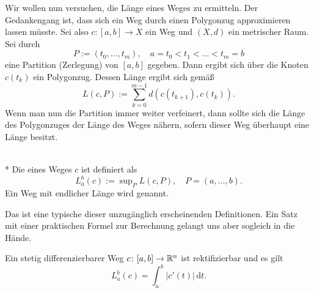 Wir wollen nun versuchen, die Länge eines Weges zu ermitteln.
Der Gedankengang ist, dass sich ein Weg durch einen Polygonzug
approximieren lassen müsste. Sei also $c\colon [a,b]\to X$
ein Weg und $(X,d)$ ein metrischer Raum. Sei durch%
\begin{equation}
P:=(t_0,\ldots,t_m),\quad a=t_0<t_1<\ldots <t_m=b
\end{equation}
eine Partition (Zerlegung) von $[a,b]$ gegeben. Dann ergibt sich
über die Knoten $c(t_k)$ ein Polygonzug. Dessen Länge ergibt
sich gemäß%
\begin{equation}
L(c,P) := \sum_{k=0}^{m-1} d(c(t_{k+1}),c(t_k)).
\end{equation}
Wenn man nun die Partition immer weiter verfeinert, dann sollte
sich die Länge des Polygonzuges der Länge des Weges nähern, sofern
dieser Weg überhaupt eine Länge besitzt.
\begin{definition}%
\mbox{}\\*
Die  eines Weges $c$ ist definiert als%
\begin{equation}
L_a^b(c) := \sup\nolimits_P L(c,P), \quad P=(a,\ldots,b).
\end{equation}
Ein Weg mit endlicher Länge wird  genannt.
\end{definition}
Das ist eine typische dieser unzugänglich erscheinenden Definitionen.
Ein Satz mit einer praktischen Formel zur Berechnung gelangt uns
aber sogleich in die Hände.
\begin{theorem}
Ein stetig differenzierbarer Weg $c\colon [a,b]\to\mathbb R^n$ ist
rektifizierbar und es gilt%
\begin{equation}\label{eq:Laenge}
L_a^b(c) = \int_a^b |c'(t)|\,\mathrm dt.
\end{equation}
\end{theorem}

